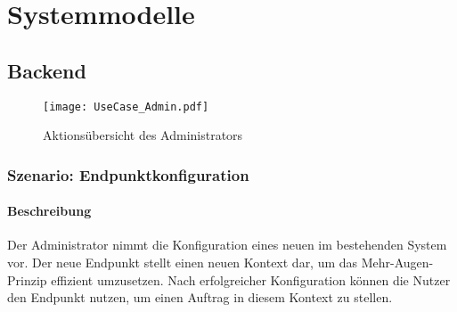 \section{Systemmodelle}
\subsection{Backend}
\begin{figure}[htbp]
	\centering
	\texttt{[image: UseCase\_Admin.pdf]}
	\caption{Aktionsübersicht des Administrators}
	\label{fig:Bild1}
\end{figure}
\subsubsection{Szenario: Endpunktkonfiguration}
\paragraph{Beschreibung}
Der \gls{Administrator} nimmt die Konfiguration eines neuen  im bestehenden \gls{System} vor.
Der neue Endpunkt stellt einen neuen Kontext dar, um das Mehr-Augen-Prinzip effizient umzusetzen.
Nach erfolgreicher Konfiguration können die \gls{Nutzer} den Endpunkt nutzen, um einen \gls{Auftrag} in diesem Kontext zu stellen.

